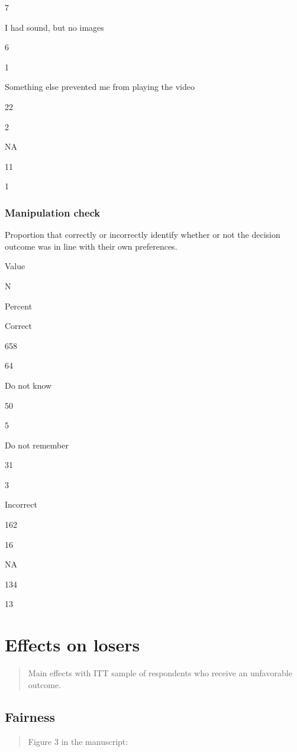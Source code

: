 \documentclass[
]{book}
\begin{document}
7

I had sound, but no images

6

1

Something else prevented me from playing the video

22

2

NA

11

1

\hypertarget{manipulation-check}{%
\subsection{Manipulation check}\label{manipulation-check}}

Proportion that correctly or incorrectly identify whether or not the
decision outcome was in line with their own preferences.

Value

N

Percent

Correct

658

64

Do not know

50

5

Do not remember

31

3

Incorrect

162

16

NA

134

13

\hypertarget{effects-on-losers-1}{%
\chapter{Effects on losers}\label{effects-on-losers-1}}

\begin{quote}
Main effects with ITT sample of respondents who receive an unfavorable
outcome.
\end{quote}

\hypertarget{fairness-3}{%
\section{Fairness}\label{fairness-3}}

\begin{quote}
Figure 3 in the manuscript:
\end{quote}
\end{document}
